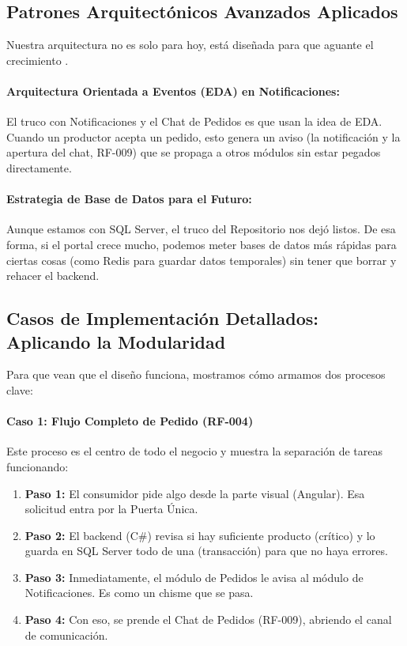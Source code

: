 \subsection{Patrones Arquitectónicos Avanzados Aplicados}

Nuestra arquitectura no es solo para hoy, está diseñada para que aguante el crecimiento \cite{ciclos2024}.

\paragraph{Arquitectura Orientada a Eventos (EDA) en Notificaciones:} El truco con Notificaciones y el Chat de Pedidos es que usan la idea de EDA. Cuando un productor acepta un pedido, esto genera un aviso (la notificación y la apertura del chat, RF-009) que se propaga a otros módulos sin estar pegados directamente.

\paragraph{Estrategia de Base de Datos para el Futuro:} Aunque estamos con SQL Server, el truco del Repositorio nos dejó listos. De esa forma, si el portal crece mucho, podemos meter bases de datos más rápidas para ciertas cosas (como Redis para guardar datos temporales) sin tener que borrar y rehacer el backend.

\subsection{Casos de Implementación Detallados: Aplicando la Modularidad}

Para que vean que el diseño funciona, mostramos cómo armamos dos procesos clave:

\paragraph{Caso 1: Flujo Completo de Pedido (RF-004)}

Este proceso es el centro de todo el negocio y muestra la separación de tareas funcionando:

\begin{enumerate}
\item \textbf{Paso 1:} El consumidor pide algo desde la parte visual (Angular). Esa solicitud entra por la Puerta Única.

\item \textbf{Paso 2:} El backend (C\#) revisa si hay suficiente producto (crítico) y lo guarda en SQL Server todo de una (transacción) para que no haya errores.

\item \textbf{Paso 3:} Inmediatamente, el módulo de Pedidos le avisa al módulo de Notificaciones. Es como un chisme que se pasa.

\item \textbf{Paso 4:} Con eso, se prende el Chat de Pedidos (RF-009), abriendo el canal de comunicación.
\end{enumerate}


